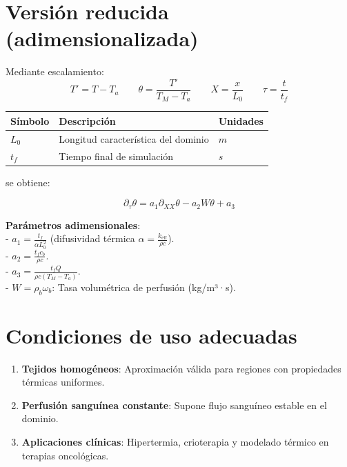 \documentclass[
  spanish,
  us-letterpaper,
  DIV=11,
  numbers=noendperiod]{scrreprt}
\providecommand{\tightlist}{%
  \setlength{\itemsep}{0pt}\setlength{\parskip}{0pt}}
\begin{document}
\section{Versión reducida
(adimensionalizada)}\label{versiuxf3n-reducida-adimensionalizada}

Mediante escalamiento: \begin{equation}
T' = T - T_a \qquad \theta = \dfrac{T'}{T_M - T_a} \qquad X = \dfrac{x}{L_0} \qquad \tau = \dfrac{t}{t_f}
\end{equation}

\begin{longtable}[]{@{}lll@{}}
\toprule\noalign{}
Símbolo & Descripción & Unidades \\
\midrule\noalign{}
\endhead
\bottomrule\noalign{}
\endlastfoot
\(L_0\) & Longitud característica del dominio & \(m\) \\
\(t_f\) & Tiempo final de simulación & \(s\) \\
\end{longtable}

se obtiene:

\begin{equation}
\partial_{\tau} \theta = a_1 \partial_{XX} \theta - a_2 W \theta + a_3
\end{equation}

\textbf{Parámetros adimensionales}:\\
- \(a_1 = \frac{t_f}{\alpha L_0^2}\) (difusividad térmica
\(\alpha = \frac{k_{\text{eff}}}{\rho c}\)).\\
- \(a_2 = \frac{t_f c_b}{\rho c}\).\\
- \(a_3 = \frac{t_f Q}{\rho c (T_M - T_a)}\).\\
- \(W = \rho_b \omega_b\): Tasa volumétrica de perfusión (kg/m³·s).

\section{Condiciones de uso
adecuadas}\label{condiciones-de-uso-adecuadas}

\begin{enumerate}
\def\labelenumi{\arabic{enumi}.}
\tightlist
\item
  \textbf{Tejidos homogéneos}: Aproximación válida para regiones con
  propiedades térmicas uniformes.\\
\item
  \textbf{Perfusión sanguínea constante}: Supone flujo sanguíneo estable
  en el dominio.\\
\item
  \textbf{Aplicaciones clínicas}: Hipertermia, crioterapia y modelado
  térmico en terapias oncológicas.
\end{enumerate}
\end{document}
